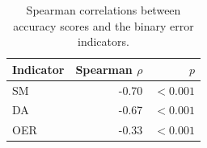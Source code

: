 \begin{table}[H]
\caption{Spearman correlations between accuracy scores and the binary error indicators.}
\label{tab:accuracy:spearman}
\centering
\begin{tabular}{lrr}
\toprule
Indicator & Spearman $\rho$ & $p$ \\
\midrule
SM & -0.70 & $<0.001$ \\
DA & -0.67 & $<0.001$ \\
OER & -0.33 & $<0.001$ \\
\bottomrule
\end{tabular}
\end{table}
